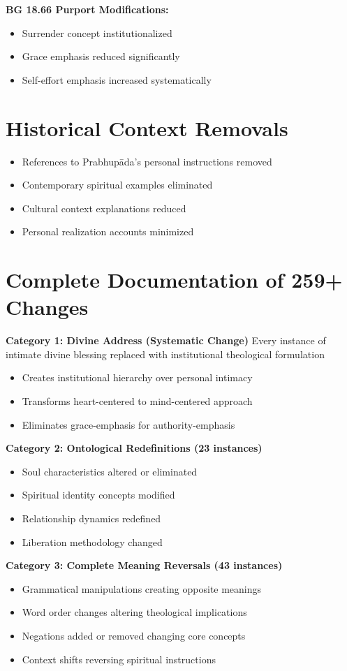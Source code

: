 \documentclass[11pt,twoside]{book}
\begin{document}
\textbf{\textbf{BG 18.66 Purport Modifications:}}
\begin{itemize}
\item Surrender concept institutionalized
\item Grace emphasis reduced significantly
\item Self-effort emphasis increased systematically
\end{itemize}
\section*{Historical Context Removals}
\label{sec:orga805f62}
\begin{itemize}
\item References to Prabhupāda's personal instructions removed
\item Contemporary spiritual examples eliminated
\item Cultural context explanations reduced
\item Personal realization accounts minimized
\end{itemize}
\section*{Complete Documentation of 259+ Changes}
\label{sec:orgec9c189}

\textbf{\textbf{Category 1: Divine Address (Systematic Change)}}
Every instance of intimate divine blessing replaced with institutional theological formulation
\begin{itemize}
\item Creates institutional hierarchy over personal intimacy
\item Transforms heart-centered to mind-centered approach
\item Eliminates grace-emphasis for authority-emphasis
\end{itemize}

\textbf{\textbf{Category 2: Ontological Redefinitions (23 instances)}}
\begin{itemize}
\item Soul characteristics altered or eliminated
\item Spiritual identity concepts modified
\item Relationship dynamics redefined
\item Liberation methodology changed
\end{itemize}

\textbf{\textbf{Category 3: Complete Meaning Reversals (43 instances)}}
\begin{itemize}
\item Grammatical manipulations creating opposite meanings
\item Word order changes altering theological implications
\item Negations added or removed changing core concepts
\item Context shifts reversing spiritual instructions
\end{itemize}
\end{document}
